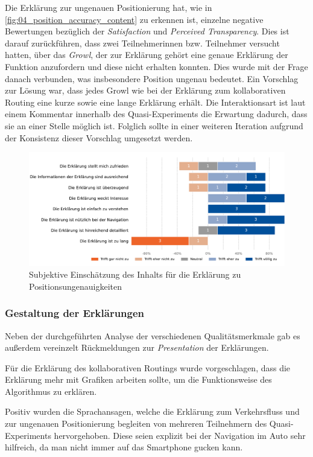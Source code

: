 Die Erklärung zur ungenauen Positionierung hat, wie in \autoref{fig:04_position_accuracy_content} zu erkennen ist, einzelne negative Bewertungen bezüglich der \textit{Satisfaction} und \textit{Perceived Transparency}. Dies ist darauf zurückführen, dass zwei Teilnehmerinnen bzw. Teilnehmer versucht hatten, über das \textit{Growl}, der zur Erklärung gehört eine genaue Erklärung der Funktion anzufordern und diese nicht erhalten konnten. Dies wurde mit der Frage danach verbunden, was insbesondere \glqq Position ungenau\grqq{} bedeutet. Ein Vorschlag zur Lösung war, dass jedes \glqq Growl\grqq{} wie bei der Erklärung zum kollaborativen Routing eine kurze sowie eine lange Erklärung erhält. Die Interaktionsart ist laut einem Kommentar innerhalb des Quasi-Experiments die Erwartung dadurch, dass sie an einer Stelle möglich ist. Folglich sollte in einer weiteren Iteration aufgrund der Konsistenz dieser Vorschlag umgesetzt werden.

\begin{figure}[b!]
    \centering
    \includegraphics[width=\textwidth]{contents/06_model_evaluation/02_evaluation/res/qualitativeFeedback-04_position_accuracy_content.pdf}
    \caption{Subjektive Einschätzung des Inhalts für die Erklärung zu Positionsungenauigkeiten}
    \label{fig:04_position_accuracy_content}
\end{figure}

\subsubsection{Gestaltung der Erklärungen}

Neben der durchgeführten Analyse der verschiedenen Qualitätsmerkmale gab es außerdem vereinzelt Rückmeldungen zur \textit{Presentation} der Erklärungen.

Für die Erklärung des kollaborativen Routings wurde vorgeschlagen, dass die Erklärung mehr mit Grafiken arbeiten sollte, um die Funktionsweise des Algorithmus zu erklären.

Positiv wurden die Sprachansagen, welche die Erklärung zum Verkehrsfluss und zur ungenauen Positionierung begleiten von mehreren Teilnehmern des Quasi-Experiments hervorgehoben. Diese seien explizit bei der Navigation im Auto sehr hilfreich, da man nicht immer auf das Smartphone gucken kann. 
